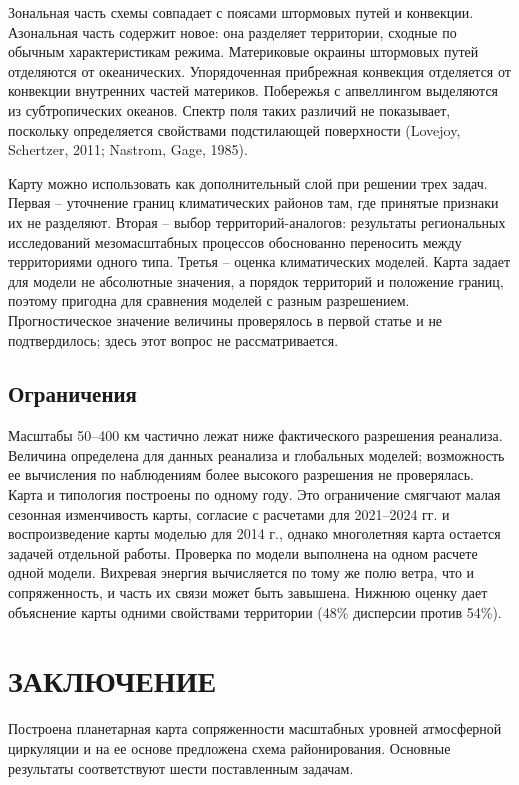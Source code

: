 \documentclass[12pt,a4paper]{article}
\begin{document}
Зональная часть схемы совпадает с поясами штормовых путей и конвекции. Азональная часть содержит новое: она разделяет территории, сходные по обычным характеристикам режима. Материковые окраины штормовых путей отделяются от океанических. Упорядоченная прибрежная конвекция отделяется от конвекции внутренних частей материков. Побережья с апвеллингом выделяются из субтропических океанов. Спектр поля таких различий не показывает, поскольку определяется свойствами подстилающей поверхности (Lovejoy, Schertzer, 2011; Nastrom, Gage, 1985).

Карту можно использовать как дополнительный слой при решении трех задач. Первая -- уточнение границ климатических районов там, где принятые признаки их не разделяют. Вторая -- выбор территорий-аналогов: результаты региональных исследований мезомасштабных процессов обоснованно переносить между территориями одного типа. Третья -- оценка климатических моделей. Карта задает для модели не абсолютные значения, а порядок территорий и положение границ, поэтому пригодна для сравнения моделей с разным разрешением. Прогностическое значение величины проверялось в первой статье и не подтвердилось; здесь этот вопрос не рассматривается.

\subsection{Ограничения}

Масштабы 50--400 км частично лежат ниже фактического разрешения реанализа. Величина определена для данных реанализа и глобальных моделей; возможность ее вычисления по наблюдениям более высокого разрешения не проверялась. Карта и типология построены по одному году. Это ограничение смягчают малая сезонная изменчивость карты, согласие с расчетами для 2021--2024 гг. и воспроизведение карты моделью для 2014 г., однако многолетняя карта остается задачей отдельной работы. Проверка по модели выполнена на одном расчете одной модели. Вихревая энергия вычисляется по тому же полю ветра, что и сопряженность, и часть их связи может быть завышена. Нижнюю оценку дает объяснение карты одними свойствами территории (48\% дисперсии против 54\%).

\section{ЗАКЛЮЧЕНИЕ}

Построена планетарная карта сопряженности масштабных уровней атмосферной циркуляции и на ее основе предложена схема районирования. Основные результаты соответствуют шести поставленным задачам.
\end{document}
